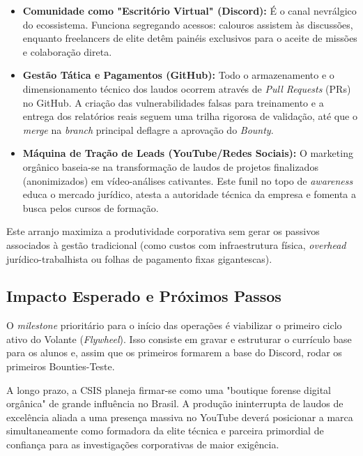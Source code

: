 \documentclass[../main.tex]{subfiles}
\begin{document}
\begin{itemize}
  \item \textbf{Comunidade como "Escritório Virtual" (Discord):} É o canal nevrálgico do ecossistema. Funciona segregando acessos: calouros assistem às discussões, enquanto freelancers de elite detêm painéis exclusivos para o aceite de missões e colaboração direta.
  \item \textbf{Gestão Tática e Pagamentos (GitHub):} Todo o armazenamento e o dimensionamento técnico dos laudos ocorrem através de \textit{Pull Requests} (PRs) no GitHub. A criação das vulnerabilidades falsas para treinamento e a entrega dos relatórios reais seguem uma trilha rigorosa de validação, até que o \textit{merge} na \textit{branch} principal deflagre a aprovação do \textit{Bounty}.
  \item \textbf{Máquina de Tração de Leads (YouTube/Redes Sociais):} O marketing orgânico baseia-se na transformação de laudos de projetos finalizados (anonimizados) em vídeo-análises cativantes. Este funil no topo de \textit{awareness} educa o mercado jurídico, atesta a autoridade técnica da empresa e fomenta a busca pelos cursos de formação.
\end{itemize}

Este arranjo maximiza a produtividade corporativa sem gerar os passivos associados à gestão tradicional (como custos com infraestrutura física, \textit{overhead} jurídico-trabalhista ou folhas de pagamento fixas gigantescas).

\subsection{Impacto Esperado e Próximos Passos}

O \textit{milestone} prioritário para o início das operações é viabilizar o primeiro ciclo ativo do Volante (\textit{Flywheel}). Isso consiste em gravar e estruturar o currículo base para os alunos e, assim que os primeiros formarem a base do Discord, rodar os primeiros Bounties-Teste.

A longo prazo, a CSIS planeja firmar-se como uma "boutique forense digital orgânica" de grande influência no Brasil. A produção ininterrupta de laudos de excelência aliada a uma presença massiva no YouTube deverá posicionar a marca simultaneamente como formadora da elite técnica e parceira primordial de confiança para as investigações corporativas de maior exigência.
\end{document}

